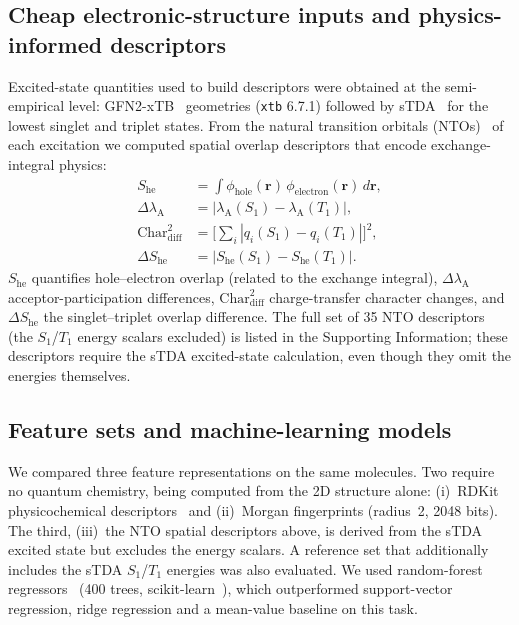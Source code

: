 \subsection{Cheap electronic-structure inputs and physics-informed descriptors}

Excited-state quantities used to build descriptors were obtained at the
semi-empirical level: GFN2-xTB~\cite{Bannwarth2019} geometries
(\texttt{xtb} 6.7.1) followed by sTDA~\cite{Grimme2017} for the lowest singlet
and triplet states. From the natural transition orbitals
(NTOs)~\cite{Martin2003} of each excitation we computed spatial overlap
descriptors that encode exchange-integral physics:
\begin{align}
  S_\text{he} &= \int \phi_\text{hole}(\mathbf{r})\,\phi_\text{electron}(\mathbf{r})\,d\mathbf{r}, \label{eq:overlap}\\
  \Delta\lambda_\text{A} &= |\lambda_\text{A}(S_1) - \lambda_\text{A}(T_1)|, \label{eq:delta_lambda}\\
  \text{Char}_\text{diff}^2 &= \Big[\textstyle\sum_i |q_i(S_1) - q_i(T_1)|\Big]^2, \label{eq:char_diff}\\
  \Delta S_\text{he} &= |S_\text{he}(S_1) - S_\text{he}(T_1)|. \label{eq:delta_overlap}
\end{align}
$S_\text{he}$ quantifies hole--electron overlap (related to the exchange
integral), $\Delta\lambda_\text{A}$ acceptor-participation differences,
$\text{Char}_\text{diff}^2$ charge-transfer character changes, and
$\Delta S_\text{he}$ the singlet--triplet overlap difference. The full set of
\num{35} NTO descriptors (the $S_1$/$T_1$ energy scalars excluded) is listed in
the Supporting Information; these descriptors require the sTDA excited-state
calculation, even though they omit the energies themselves.

\subsection{Feature sets and machine-learning models}

We compared three feature representations on the same molecules. Two require no
quantum chemistry, being computed from the 2D structure alone:
(i)~RDKit physicochemical descriptors~\cite{Landrum2016} and (ii)~Morgan
fingerprints (radius~2, \num{2048} bits). The third, (iii)~the NTO spatial
descriptors above, is derived from the sTDA excited state but excludes the energy
scalars. A reference set that additionally includes the sTDA $S_1$/$T_1$
energies was also evaluated. We used random-forest
regressors~\cite{Breiman2001} (\num{400} trees, scikit-learn~\cite{Pedregosa2011}),
which outperformed support-vector regression, ridge regression and a mean-value
baseline on this task.

